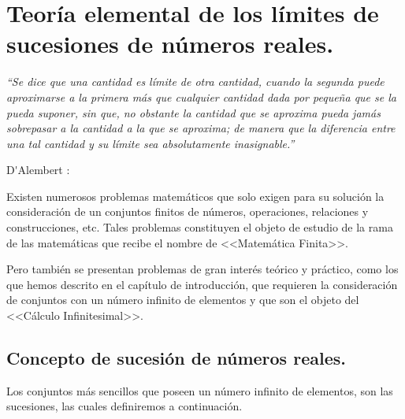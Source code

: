 
\chapter{Teor\'ia elemental de los l\'imites de sucesiones de n\'umeros
reales. }
\begin{flushright}
\vspace*{-2cm}
\begin{minipage}[c]{0.4\columnwidth}%
\textit{\footnotesize{}“Se dice que una cantidad es límite de otra
cantidad, cuando la segunda puede aproximarse a la primera más que
cualquier cantidad dada por pequeña que se la pueda suponer, sin que,
no obstante la cantidad que se aproxima pueda jamás sobrepasar a la
cantidad a la que se aproxima; de manera que la diferencia entre una
tal cantidad y su límite sea absolutamente inasignable.”} %
\end{minipage}
\par\end{flushright}

\begin{flushright}
D\'{ }Alembert : 
\par\end{flushright}

\vspace*{-1mm}

\PartialToc

\hypersetup{linkcolor=ptctitle}

\vspace*{10pt}

\intro

Existen numerosos problemas matemáticos que solo exigen para su solución
la consideración de un conjuntos finitos de números, operaciones,
relaciones y construcciones, etc. Tales problemas constituyen el objeto
de estudio de la rama de las matemáticas que recibe el nombre de <<Matemática
Finita>>.

Pero también se presentan problemas de gran interés teórico y práctico,
como los que hemos descrito en el capítulo de introducción, que requieren
la consideración de conjuntos con un número infinito de elementos
y que son el objeto del <<Cálculo Infinitesimal>>.

\section{Concepto de sucesi\'on de n\'umeros reales. }

Los conjuntos más sencillos que poseen un número infinito de elementos,
son las sucesiones, las cuales definiremos a continuación.

